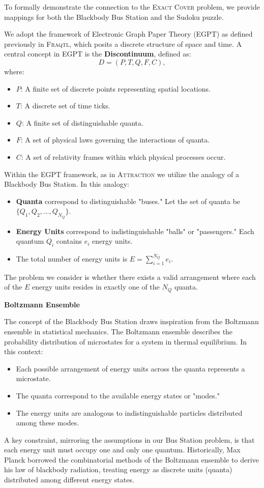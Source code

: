 \documentclass{report}
\begin{document}
To formally demonstrate the connection to the \textsc{Exact Cover} problem, we provide mappings for both the Blackbody Bus Station and the Sudoku puzzle.

We adopt the framework of Electronic Graph Paper Theory (EGPT) as defined previously in \textsc{Fraqtl}\cite{FRAQTL2024}, which posits a discrete structure of space and time. A central concept in EGPT is the \textbf{Discontinuum}, defined as:
\[
D = (P, T, Q, F, C),
\]
where:
\begin{itemize}
    \item $P$: A finite set of discrete points representing spatial locations.
    \item $T$: A discrete set of time ticks.
    \item $Q$: A finite set of distinguishable quanta.
    \item $F$: A set of physical laws governing the interactions of quanta.
    \item $C$: A set of relativity frames within which physical processes occur.
\end{itemize}

Within the EGPT framework, as in \textsc{Attraction} we utilize the analogy of a Blackbody Bus Station. In this analogy:
\begin{itemize}
    \item \textbf{Quanta} correspond to distinguishable "buses." Let the set of quanta be $\{Q_1, Q_2, ..., Q_{N_Q}\}$.
    \item \textbf{Energy Units} correspond to indistinguishable "balls" or "passengers." Each quantum $Q_i$ contains $e_i$ energy units.
    \item The total number of energy units is $E = \sum_{i=1}^{N_Q} e_i$.
\end{itemize}
The problem we consider is whether there exists a valid arrangement where each of the $E$ energy units resides in exactly one of the $N_Q$ quanta.

\medskip
\noindent \textbf{Boltzmann Ensemble}

The concept of the Blackbody Bus Station draws inspiration from the Boltzmann ensemble in statistical mechanics. The Boltzmann ensemble describes the probability distribution of microstates for a system in thermal equilibrium. In this context:
\begin{itemize}
    \item Each possible arrangement of energy units across the quanta represents a microstate.
    \item The quanta correspond to the available energy states or "modes."
    \item The energy units are analogous to indistinguishable particles distributed among these modes.
\end{itemize}
A key constraint, mirroring the assumptions in our Bus Station problem, is that each energy unit must occupy one and only one quantum. Historically, Max Planck borrowed the combinatorial methods of the Boltzmann ensemble to derive his law of blackbody radiation, treating energy as discrete units (quanta) distributed among different energy states.
\end{document}
